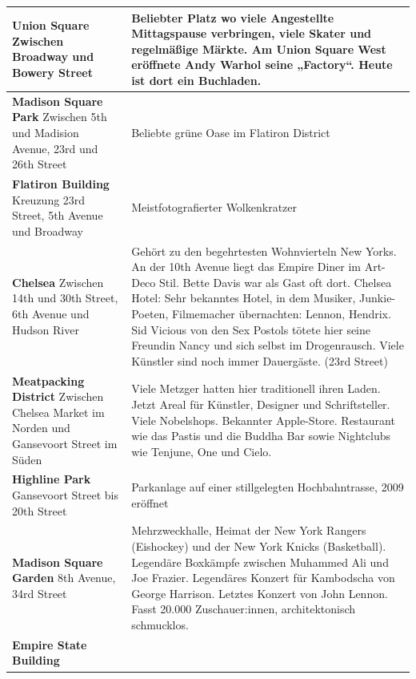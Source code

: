 \documentclass[fontsize=14pt,a4paper,headinclude,DIV=calc,automark]{scrbook}
\begin{document}
{\begin{longtable}{
    >{\raggedright\arraybackslash\columncolor{tablecellblue}}p{5.1cm}
    >{\raggedright\arraybackslash\columncolor{rightcolumn}}p{10cm}
    }
    \textbf{Union Square}\newline
    Zwischen Broadway und Bowery Street & Beliebter Platz wo viele Angestellte Mittagspause verbringen, viele Skater und regelmäßige Märkte. Am Union Square West eröffnete Andy Warhol seine „Factory“. Heute ist dort ein Buchladen. \\ \midrule
    \textbf{Madison Square Park}\newline
    Zwischen 5th und Madision Avenue, 23rd und 26th Street & Beliebte grüne Oase im Flatiron District \\ \midrule
    \textbf{Flatiron Building}\newline
    Kreuzung 23rd Street, 5th Avenue und Broadway & Meistfotografierter Wolkenkratzer \\ \midrule
    \textbf{Chelsea}\newline
    Zwischen 14th und 30th Street, 6th Avenue und Hudson River & Gehört zu den begehrtesten Wohnvierteln New Yorks. An der 10th Avenue liegt das Empire Diner im Art-Deco Stil. Bette Davis war als Gast oft dort. Chelsea Hotel: Sehr bekanntes Hotel, in dem Musiker, Junkie-Poeten, Filmemacher übernachten: Lennon, Hendrix. Sid Vicious von den Sex Postols tötete hier seine Freundin Nancy und sich selbst im Drogenrausch. Viele Künstler sind noch immer Dauergäste. (23rd Street) \\ \midrule
    \textbf{Meatpacking District}\newline
    Zwischen Chelsea Market im Norden und Gansevoort Street im Süden & Viele Metzger hatten hier traditionell ihren Laden. Jetzt Areal für Künstler, Designer und Schriftsteller. Viele Nobelshops. Bekannter Apple-Store. Restaurant wie das Pastis und die Buddha Bar sowie Nightclubs wie Tenjune, One und Cielo. \\ \midrule
    \textbf{Highline Park}\newline
    Gansevoort Street bis 20th Street & Parkanlage auf einer stillgelegten Hochbahntrasse, 2009 eröffnet \\ \midrule
    \textbf{Madison Square Garden}\newline
    8th Avenue, 34rd Street & Mehrzweckhalle, Heimat der New York Rangers (Eishockey) und der New York Knicks (Basketball). Legendäre Boxkämpfe zwischen Muhammed Ali und Joe Frazier. Legendäres Konzert für Kambodscha von George Harrison. Letztes Konzert von John Lennon. Fasst 20.000 Zuschauer:innen, architektonisch schmucklos. \\ \midrule
    \textbf{Empire State Building}\newline

\end{longtable}}
\end{document}
